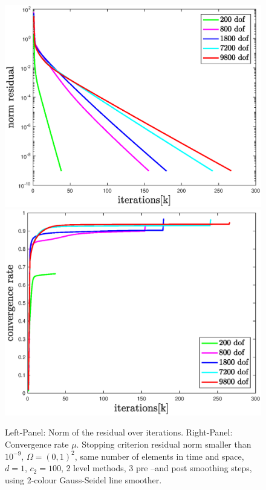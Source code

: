 \documentclass[../draft_1.tex]{subfiles}
\begin{document}
\begin{figure}[h!]
	\centering
	\includegraphics[scale=0.4]{images/implementation/multigrid_scaling/norm_res_scaling_mg}
		\includegraphics[scale=0.4]{images/implementation/multigrid_scaling/convergence_rate_scaling_mg}
	\caption{Left-Panel: Norm of the residual over iterations. Right-Panel: Convergence rate $\mu$. Stopping criterion residual norm smaller than $10^{-9}$, $\Omega = (0,1)^2$, same number of elements in time and space, $d = 1$, $c_2 = 100$, 2 level methods, 3 pre --and post smoothing steps, using 2-colour Gauss-Seidel line smoother.}
	\label{fig:scaling_mg_block_Jac}
\end{figure}
\end{document}
